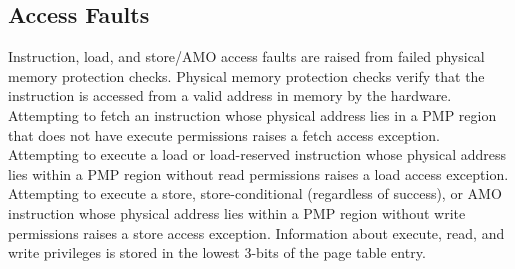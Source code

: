 \documentclass[12pt]{article}
\begin{document}
\subsection{Access Faults}
Instruction, load, and store/AMO access faults are raised from failed physical memory protection checks. Physical memory protection checks verify that the instruction is accessed from a valid address in memory by the hardware. Attempting to fetch an instruction whose physical address lies in a PMP region that does not have execute permissions raises a fetch access exception. Attempting to execute a load or load-reserved instruction whose physical address lies within a PMP region without read permissions raises a load access exception. Attempting to execute a store, store-conditional (regardless of success), or AMO instruction whose physical address lies within a PMP region without write permissions raises a store access exception. Information about execute, read, and write privileges is stored in the lowest 3-bits of the page table entry. 
\end{document}
